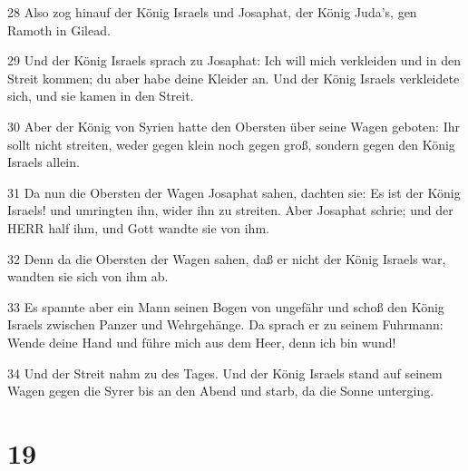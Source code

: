 \par 28 Also zog hinauf der König Israels und Josaphat, der König Juda's, gen Ramoth in Gilead.
\par 29 Und der König Israels sprach zu Josaphat: Ich will mich verkleiden und in den Streit kommen; du aber habe deine Kleider an. Und der König Israels verkleidete sich, und sie kamen in den Streit.
\par 30 Aber der König von Syrien hatte den Obersten über seine Wagen geboten: Ihr sollt nicht streiten, weder gegen klein noch gegen groß, sondern gegen den König Israels allein.
\par 31 Da nun die Obersten der Wagen Josaphat sahen, dachten sie: Es ist der König Israels! und umringten ihn, wider ihn zu streiten. Aber Josaphat schrie; und der HERR half ihm, und Gott wandte sie von ihm.
\par 32 Denn da die Obersten der Wagen sahen, daß er nicht der König Israels war, wandten sie sich von ihm ab.
\par 33 Es spannte aber ein Mann seinen Bogen von ungefähr und schoß den König Israels zwischen Panzer und Wehrgehänge. Da sprach er zu seinem Fuhrmann: Wende deine Hand und führe mich aus dem Heer, denn ich bin wund!
\par 34 Und der Streit nahm zu des Tages. Und der König Israels stand auf seinem Wagen gegen die Syrer bis an den Abend und starb, da die Sonne unterging.

\chapter{19}


